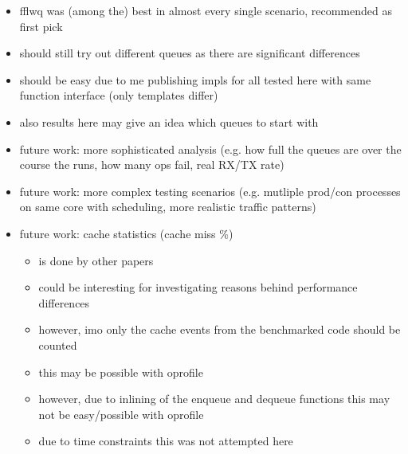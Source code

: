 \begin{itemize}
    \item fflwq was (among the) best in almost every single scenario, recommended as first pick
    \item should still try out different queues as there are significant differences
    \item should be easy due to me publishing impls for all tested here with same function interface (only templates differ)
    \item also results here may give an idea which queues to start with

    \item future work: more sophisticated analysis (e.g. how full the queues are over the course the runs,
        how many ops fail, real RX/TX rate)
    \item future work: more complex testing scenarios (e.g. mutliple prod/con processes on same core with
        scheduling, more realistic traffic patterns)
    \item future work: cache statistics (cache miss \%)
        \begin{itemize}
            \item is done by other papers
            \item could be interesting for investigating reasons behind performance differences
            \item however, imo only the cache events from the benchmarked code should be counted
            \item this may be possible with oprofile
            \item however, due to inlining of the enqueue and dequeue functions this may not be easy/possible with oprofile
            \item due to time constraints this was not attempted here
        \end{itemize}
\end{itemize}
